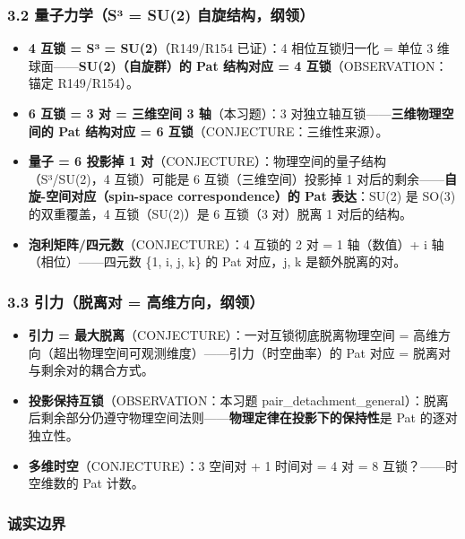 \documentclass[
]{article}
\providecommand{\tightlist}{%
  \setlength{\itemsep}{0pt}\setlength{\parskip}{0pt}}
\begin{document}
\subsubsection{3.2 量子力学（S³ = SU(2)
自旋结构，纲领）}\label{ux91cfux5b50ux529bux5b66suxb3-su2-ux81eaux65cbux7ed3ux6784ux7eb2ux9886}

\begin{itemize}
\tightlist
\item
  \textbf{4 互锁 = S³ = SU(2)}（R149/R154 已证）：4 相位互锁归一化 =
  单位 3 维球面------\textbf{SU(2)（自旋群）的 Pat 结构对应 = 4
  互锁}（OBSERVATION：锚定 R149/R154）。
\item
  \textbf{6 互锁 = 3 对 = 三维空间 3 轴}（本习题）：3
  对独立轴互锁------\textbf{三维物理空间的 Pat 结构对应 = 6
  互锁}（CONJECTURE：三维性来源）。
\item
  \textbf{量子 = 6 投影掉 1
  对}（CONJECTURE）：物理空间的量子结构（S³/SU(2)，4 互锁）可能是 6
  互锁（三维空间）投影掉 1
  对后的剩余------\textbf{自旋-空间对应（spin-space correspondence）的
  Pat 表达}：SU(2) 是 SO(3) 的双重覆盖，4 互锁（SU(2)）是 6 互锁（3
  对）脱离 1 对后的结构。
\item
  \textbf{泡利矩阵/四元数}（CONJECTURE）：4 互锁的 2 对 = 1 轴（数值）+
  i 轴（相位）------四元数 \{1, i, j, k\} 的 Pat 对应，j, k
  是额外脱离的对。
\end{itemize}

\subsubsection{3.3 引力（脱离对 =
高维方向，纲领）}\label{ux5f15ux529bux8131ux79bbux5bf9-ux9ad8ux7ef4ux65b9ux5411ux7eb2ux9886}

\begin{itemize}
\tightlist
\item
  \textbf{引力 = 最大脱离}（CONJECTURE）：一对互锁彻底脱离物理空间 =
  高维方向（超出物理空间可观测维度）------引力（时空曲率）的 Pat 对应 =
  脱离对与剩余对的耦合方式。
\item
  \textbf{投影保持互锁}（OBSERVATION：本习题
  pair\_detachment\_general）：脱离后剩余部分仍遵守物理空间法则------\textbf{物理定律在投影下的保持性}是
  Pat 的逐对独立性。
\item
  \textbf{多维时空}（CONJECTURE）：3 空间对 + 1 时间对 = 4 对 = 8
  互锁？------时空维数的 Pat 计数。
\end{itemize}

\subsubsection{诚实边界}\label{ux8bdaux5b9eux8fb9ux754c}
\end{document}
